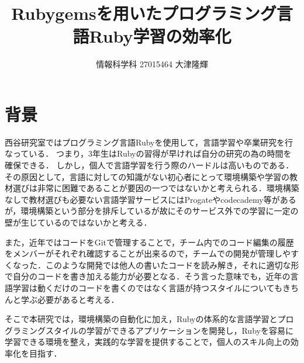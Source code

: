 \documentclass[a4j,twocolumn]{jsarticle}
\begin{document}
\title{Rubygemsを用いたプログラミング言語Ruby学習の効率化}
\author{情報科学科 \hspace{5mm} 27015464 \hspace{5mm} 大津隆輝}
\date{}
\maketitle

\section{背景}
西谷研究室ではプログラミング言語Rubyを使用して，言語学習や卒業研究を行なっている．
つまり，3年生はRubyの習得が早ければ自分の研究の為の時間を確保できる．
しかし，個人で言語学習を行う際のハードルは高いものである\cite{Oshimi}．
その原因として，言語に対しての知識がない初心者にとって環境構築や学習の教材選びは非常に困難であることが要因の一つではないかと考えられる．環境構築なしで教材選びも必要ない言語学習サービスにはProgate\cite{Progate}やcodecademy\cite{codecademy}等があるが，環境構築という部分を排斥しているが故にそのサービス外での学習に一定の壁が生じているのではないかと考える．
\par
また，近年ではコードをGitで管理することで，チーム内でのコード編集の履歴をメンバーがそれぞれ確認することが出来るので，チームでの開発が管理しやすくなった\cite{GitDevelopment}．このような開発では他人の書いたコードを読み解き，それに適切な形で自分のコードを書き加える能力が必要となる．そう言った意味でも，近年の言語学習は動くだけのコードを書くのではなく言語が持つスタイルについてもきちんと学ぶ必要があると考える．
\par
そこで本研究では，環境構築の自動化に加え，Rubyの体系的な言語学習とプログラミングスタイルの学習ができるアプリケーションを開発し，Rubyを容易に学習できる環境を整え，実践的な学習を提供することで，個人のスキル向上の効率化を目指す．
\end{document}
